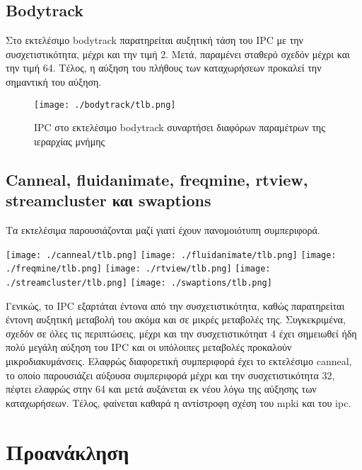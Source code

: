 \documentclass{article}
\newcommand{\eng}[1]{\foreignlanguage{english}{#1}}
\begin{document}
\subsection{\eng{Bodytrack}}

Στο εκτελέσιμο \eng{bodytrack} παρατηρείται αυξητική τάση του \eng{IPC} με την συσχετιστικότητα, μέχρι και την τιμή 2. Μετά, παραμένει σταθερό σχεδόν μέχρι και την τιμή 64. Τέλος, η αύξηση του πλήθους των καταχωρήσεων προκαλεί την σημαντική του αύξηση. 

\begin{figure}[h]
    \centering
    \texttt{[image: ./bodytrack/tlb.png]} 
    \caption{\eng{IPC} στο εκτελέσιμο \eng{bodytrack} συναρτήσει διαφόρων παραμέτρων της ιεραρχίας μνήμης}
    \label{fig:exp3-bodytrack}
\end{figure}
\FloatBarrier

\subsection{\eng{Canneal}, \eng{fluidanimate}, \eng{freqmine}, \eng{rtview}, \eng{streamcluster} και \eng{swaptions}}

Τα εκτελέσιμα παρουσιάζονται μαζί γιατί έχουν πανομοιότυπη συμπεριφορά.

\begin{center}
    \texttt{[image: ./canneal/tlb.png]} 
    \texttt{[image: ./fluidanimate/tlb.png]} 
    \texttt{[image: ./freqmine/tlb.png]} 
    \texttt{[image: ./rtview/tlb.png]} 
    \texttt{[image: ./streamcluster/tlb.png]} 
    \texttt{[image: ./swaptions/tlb.png]} 
\end{center}

\clearpage
 Γενικώς, το \eng{IPC} εξαρτάται έντονα από την συσχετιστικότητα, καθώς παρατηρείται έντονη αυξητική μεταβολή του ακόμα και σε μικρές μεταβολές της. Συγκεκριμένα, σχεδόν σε όλες τις περιπτώσεις, μέχρι και την συσχετιστικότηατ 4 έχει σημειωθεί ήδη πολύ μεγάλη αύξηση του \eng{IPC} και οι υπόλοιπες μεταβολές προκαλούν μικροδιακυμάνσεις. Ελαφρώς διαφορετική συμπεριφορά έχει το εκτελέσιμο \eng{canneal}, το οποίο παρουσιάζει αύξουσα συμπεριφορά μέχρι και την συσχετιστικότητα 32, πέφτει ελαφρώς στην 64 και μετά αυξάνεται εκ νέου λόγω της αύξησης των καταχωρήσεων. Τέλος, φαίνεται καθαρά η αντίστροφη σχέση του \eng{mpki} και του \eng{ipc}. 

\clearpage
\section{Προανάκληση}
\end{document}
